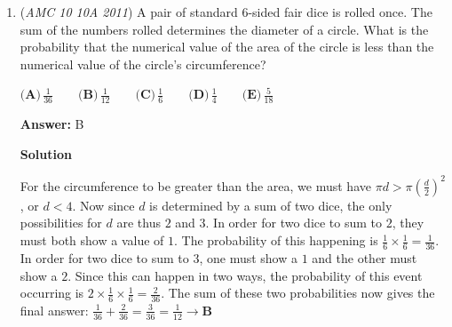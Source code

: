 \begin{enumerate}
 $\textbf{(A)}\,12 \qquad\textbf{(B)}\,20 \qquad\textbf{(C)}\,72 \qquad\textbf{(D)}\,120 \qquad\textbf{(E)}\,200$

 \textbf{Answer: }A



\textbf{Solution 1}

We split up into cases of the hundreds digits being $2$ or $5$. If the hundred digits is $2$, then the units digits must be $8$ in order for the number to be even and then there are $4$ remaining choices ($1,5,7,9$) for the tens digit, giving $1 \times 1 \times 4=4$ possibilities. Similarly, there are $1 \times 2 \times 4=8$ possibilities for the $5$ case, giving a total of $4+8=\boxed{\ \mathbf{(A)} 12}$ possibilities.

 



\textbf{Solution 2}

We see that the last digit of the $3$-digit number must be even to have an even number. Therefore, the last digit must either be $2$ or $8$. 

 Case $1$-the last digit is $2$. We must have the hundreds digit to be $5$ and the tens digit to be any $1$ of ${1,7,8,9}$, thus obtaining $4$ numbers total.

 Case $2$-the last digit is $8$. We now can have $2$ or $5$ to be the hundreds digit, and any choice still gives us $4$ choices for the tens digit. Therefore, we have $2 \cdot 4=8$ numbers. 

 Adding up our cases, we have $4+8=\boxed{\text{(A)}12}$ numbers.

 


	\item (\textit{AMC 10 10A 2011}) A pair of standard 6-sided fair dice is rolled once.  The sum of the numbers rolled determines the diameter of a circle.  What is the probability that the numerical value of the area of the circle is less than the numerical value of the circle's circumference?


 $\textbf{(A)}\,\frac{1}{36} \qquad\textbf{(B)}\,\frac{1}{12} \qquad\textbf{(C)}\,\frac{1}{6} \qquad\textbf{(D)}\,\frac{1}{4} \qquad\textbf{(E)}\,\frac{5}{18}$

 \textbf{Answer: }B



\textbf{Solution}

For the circumference to be greater than the area, we must have $\pi d > \pi \left( \frac{d}{2} \right) ^2$, or $d<4$. Now since $d$ is determined by a sum of two dice, the only possibilities for $d$ are thus $2$ and $3$. In order for two dice to sum to $2$, they must both show a value of $1$. The probability of this happening is $\frac{1}{6} \times \frac{1}{6} = \frac{1}{36}$. In order for two dice to sum to $3$, one must show a $1$ and the other must show a $2$. Since this can happen in two ways, the probability of this event occurring is $2 \times \frac{1}{6} \times \frac{1}{6} = \frac{2}{36}$. The sum of these two probabilities now gives the final answer: $\frac{1}{36} + \frac{2}{36} = \frac{3}{36} = \frac{1}{12} \rightarrow \boxed{\textbf{B}}$




\end{enumerate}
